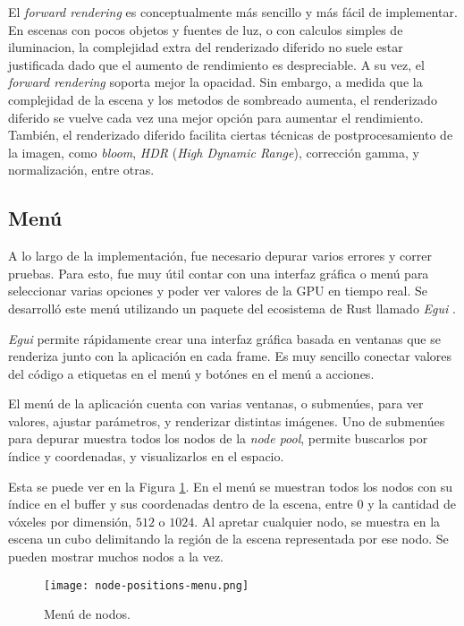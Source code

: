 El \textit{forward rendering} es conceptualmente más sencillo y más fácil de implementar.
En escenas con pocos objetos y fuentes de luz, o con calculos simples de iluminacion, la complejidad extra del renderizado diferido no suele estar justificada dado que el aumento de rendimiento es despreciable.
A su vez, el \textit{forward rendering} soporta mejor la opacidad.
Sin embargo, a medida que la complejidad de la escena y los metodos de sombreado aumenta, el renderizado diferido se vuelve cada vez una mejor opción para aumentar el rendimiento.
También, el renderizado diferido facilita ciertas técnicas de postprocesamiento de la imagen, como \textit{bloom}, \textit{HDR} (\textit{High Dynamic Range}), corrección gamma, y normalización, entre otras.

\subsection{Menú}

A lo largo de la implementación, fue necesario depurar varios errores y correr pruebas.
Para esto, fue muy útil contar con una interfaz gráfica o menú para seleccionar varias opciones y poder ver valores de la GPU en tiempo real.
Se desarrolló este menú utilizando un paquete del ecosistema de Rust llamado \textit{Egui} \cite{egui}.

\textit{Egui} permite rápidamente crear una interfaz gráfica basada en ventanas que se renderiza junto con la aplicación en cada frame.
Es muy sencillo conectar valores del código a etiquetas en el menú y botónes en el menú a acciones.

El menú de la aplicación cuenta con varias ventanas, o submenúes, para ver valores, ajustar parámetros, y renderizar distintas imágenes.
Uno de submenúes para depurar muestra todos los nodos de la \textit{node pool}, permite buscarlos por índice y coordenadas, y visualizarlos en el espacio.

Esta se puede ver en la Figura \ref{fig:node-positions-menu}.
En el menú se muestran todos los nodos con su índice en el buffer y sus coordenadas dentro de la escena, entre $0$ y la cantidad de vóxeles por dimensión, $512$ o $1024$.
Al apretar cualquier nodo, se muestra en la escena un cubo delimitando la región de la escena representada por ese nodo.
Se pueden mostrar muchos nodos a la vez.

\begin{figure}
    \centering
    \texttt{[image: node-positions-menu.png]}
    \caption{Menú de nodos.}
    \label{fig:node-positions-menu}
\end{figure}

